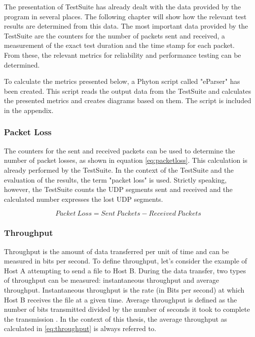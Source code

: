 The presentation of TestSuite has already dealt with the data provided by the program in several places. The following chapter will show how the relevant test results are determined from this data.
The most important data provided by the TestSuite are the counters for the number of packets sent and received, a measurement of the exact test duration and the time stamp for each packet. From these, the relevant metrics for reliability and performance testing can be determined.

To calculate the metrics presented below, a Phyton script called "eParser" has been created. This script reads the output data from the TestSuite and calculates the presented metrics and creates diagrams based on them. The script is included in the appendix.

\subsubsection{Packet Loss}
The counters for the sent and received packets can be used to determine the number of packet losses, as shown in equation \ref{eq:packetloss}. This calculation is already performed by the TestSuite.
In the context of the TestSuite and the evaluation of the results, the term "packet loss" is used. Strictly speaking, however, the TestSuite counts the UDP segments sent and received and the calculated number expresses the lost UDP segments.

\begin{equation}
Packet\ Loss = Sent\ Packets - Received\ Packets
\label{eq:packetloss}
\end{equation}

\subsubsection{Throughput}

Throughput is the amount of data transferred per unit of time and can be measured in bits per second. To define throughput, let's consider the example of Host A attempting to send a file to Host B. During the data transfer, two types of throughput can be measured: instantaneous throughput and average throughput. Instantaneous throughput is the rate (in Bits per second) at which Host B receives the file at a given time. Average throughput is defined as the number of bits transmitted divided by the number of seconds it took to complete the transmission \cite{datacalc01}. In the context of this thesis, the average throughput as calculated in \ref{eq:throughput} is always referred to.

